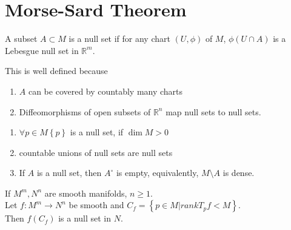 \documentclass[../main.tex]{subfiles}
\begin{document}
\section{Morse-Sard Theorem}
\begin{defn}
	A subset $A \subset M$ is a null set if for any chart $( U,\phi) $ of $M$, $\phi( U\cap A) $ is a Lebesgue null set in $ \mathbb{R}^m$.
\end{defn}
\begin{rmq}
This is well defined because
\begin{enumerate}
\item $A$ can be covered by countably many charts
\item Diffeomorphisms of open subsets of $ \mathbb{R}^n$ map null sets to null sets.
\end{enumerate}
\end{rmq}
\begin{rmq}
\begin{enumerate}
\item $\forall p \in M \left\{ p \right\} $ is a null set, if $\dim M >0$ 
\item countable unions of null sets are null sets
\item If $A$ is a null set, then $ A^{\circ}$ is empty, equivalently, $M\setminus A$ is dense.
\end{enumerate}
\end{rmq}
\begin{thm}
	If $M^{m},N^{n}$ are smooth manifolds, $n \geq 1$.\\
	Let $f:M^{m}\to N^{n}$ be smooth and $C_f= \left\{ p\in M | rank T_p f < M \right\} $.\\
	Then $f( C_f) $ is a null set in $N$.
\end{thm}
\end{document}

